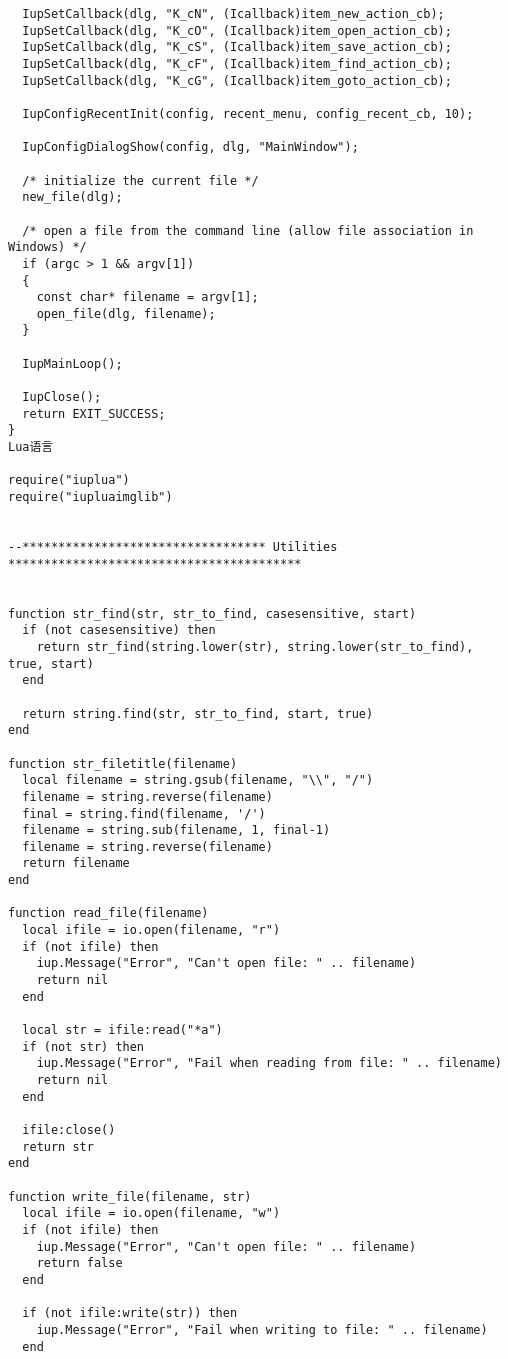 \documentclass{ctexart}
\begin{document}
\begin{lstlisting}
  IupSetCallback(dlg, "K_cN", (Icallback)item_new_action_cb);
  IupSetCallback(dlg, "K_cO", (Icallback)item_open_action_cb);
  IupSetCallback(dlg, "K_cS", (Icallback)item_save_action_cb);
  IupSetCallback(dlg, "K_cF", (Icallback)item_find_action_cb);
  IupSetCallback(dlg, "K_cG", (Icallback)item_goto_action_cb);
  
  IupConfigRecentInit(config, recent_menu, config_recent_cb, 10);

  IupConfigDialogShow(config, dlg, "MainWindow");

  /* initialize the current file */
  new_file(dlg);

  /* open a file from the command line (allow file association in Windows) */
  if (argc > 1 && argv[1])
  {
    const char* filename = argv[1];
    open_file(dlg, filename);
  }

  IupMainLoop();

  IupClose();
  return EXIT_SUCCESS;
}
Lua语言

require("iuplua")
require("iupluaimglib")


--********************************** Utilities *****************************************


function str_find(str, str_to_find, casesensitive, start)
  if (not casesensitive) then
    return str_find(string.lower(str), string.lower(str_to_find), true, start)
  end

  return string.find(str, str_to_find, start, true)
end

function str_filetitle(filename)
  local filename = string.gsub(filename, "\\", "/")
  filename = string.reverse(filename)
  final = string.find(filename, '/')
  filename = string.sub(filename, 1, final-1)
  filename = string.reverse(filename)
  return filename
end

function read_file(filename)
  local ifile = io.open(filename, "r")
  if (not ifile) then
    iup.Message("Error", "Can't open file: " .. filename)
    return nil
  end
  
  local str = ifile:read("*a")
  if (not str) then
    iup.Message("Error", "Fail when reading from file: " .. filename)
    return nil
  end
  
  ifile:close()
  return str
end

function write_file(filename, str)
  local ifile = io.open(filename, "w")
  if (not ifile) then
    iup.Message("Error", "Can't open file: " .. filename)
    return false
  end
  
  if (not ifile:write(str)) then
    iup.Message("Error", "Fail when writing to file: " .. filename)
  end
  

\end{lstlisting}
\end{document}
